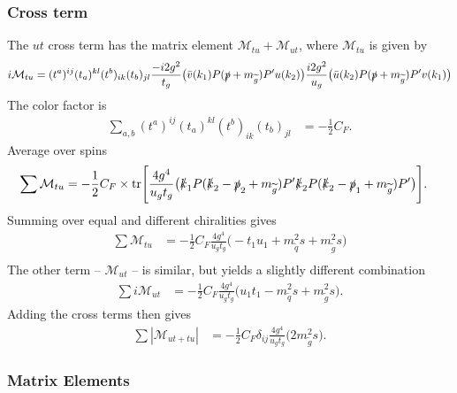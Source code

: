 \documentclass[twoside,english]{uiofysmaster}
\begin{document}
{\subsubsection{Cross term}
The $ut$ cross term has the matrix element $\mathcal{M}_{tu}+ \mathcal{M}_{ut}$, where $\mathcal{M}_{tu}$ is given by
\begin{align*}
i \mathcal{M}_{tu} &= (t^a)^{ij}(t_a)^{kl}(t^b)_{ik}(t_b)_{jl} \frac{-i 2 g^2}{t_g}\big( \bar{v} (k_1)  P (\slashed{p} + m_{\widetilde{g}}) P'u(k_2) \big)  \frac{i 2 g^2}{u_g} \big( \bar{u} (k_2)  P (\slashed{p} + m_{\widetilde{g}}) P' v(k_1) \big)\\
\end{align*}
The color factor is
\begin{align*}
\sum_{a,b}(t^a)^{ij}(t_a)^{kl}(t^b)_{ik}(t_b)_{jl} 
 &= - \frac{1}{2}C_F.
\end{align*}
Average over spins
\begin{align*}
\sum \mathcal{M}_{tu} &= - \frac{1}{2}C_F \times \text{tr}\Bigg[ \frac{4 g^4}{u_gt_g}\big( \slashed{k}_1   P (\slashed{k}_2 - \slashed{p}_2 + m_{\widetilde{g}}) P'\slashed{k}_2  P (\slashed{k}_2 -\slashed{p}_1 + m_{\widetilde{g}}) P' \big) \Bigg].
\end{align*}
Summing over equal and different chiralities gives
\begin{align*}
\sum  \mathcal{M}_{tu} 
  &= - \frac{1}{2}C_F  \frac{4 g^4}{u_gt_g} \big(
  -   t_1 u_1 + m_{\widetilde{q}}^2 s 
+  m_{\widetilde{g}}^2 s
  \big)\\
\end{align*}
The other term --  $\mathcal{M}_{ut}$ -- is similar, but yields a slightly different combination
\begin{align*}
\sum i \mathcal{M}_{ut} 
  &= - \frac{1}{2}C_F  \frac{4 g^4}{u_gt_g} \big(
u_1t_1- m_{\widetilde{q}}^2s + m_{\widetilde{g}}^2s
  \big).
\end{align*}
Adding the cross terms then gives 
\begin{align*}
\sum |\mathcal{M}_{ut+tu}| &= - \frac{1}{2}C_F \delta_{ij}  \frac{4 g^4}{u_gt_g} \big(2 m_{\widetilde{g}}^2s   \big).
\end{align*}


\subsubsection{Matrix Elements}\label{Sec:: susy hadron : Matrix Elements}

}
\end{document}
